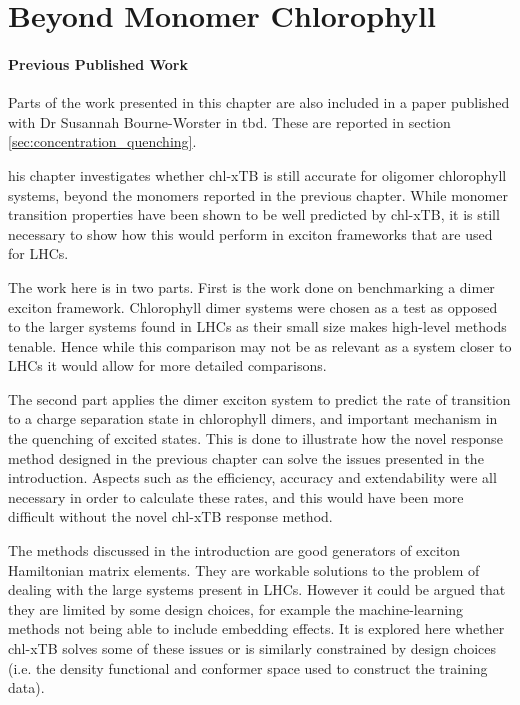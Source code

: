 %
%
\let\textcircled=\pgftextcircled
\chapter{Beyond Monomer Chlorophyll}
\label{chap:excitons}

\subsubsection*{Previous Published Work}
Parts of the work presented in this chapter are also included in a paper published 
with Dr Susannah Bourne-Worster in tbd. These are reported in section \ref{sec:concentration_quenching}.

his chapter investigates whether chl-xTB is still accurate for oligomer 
chlorophyll systems, beyond the monomers reported in the previous chapter. While
monomer transition properties have been shown to be well predicted by chl-xTB, it
is still necessary to show how this would perform in exciton frameworks that are
used for LHCs.

The work here is in two parts. First is the work done on benchmarking a dimer exciton
framework. Chlorophyll dimer systems were chosen as a test as opposed to the larger
systems found in LHCs as their small size makes high-level methods tenable. Hence
while this comparison may not be as relevant as a system closer to LHCs it would
allow for more detailed comparisons. 

The second part applies the dimer exciton system to predict the rate of transition 
to a charge separation state in chlorophyll dimers, and important mechanism in the
quenching of excited states. This is done to illustrate how the novel response method
designed in the previous chapter can solve the issues presented in the introduction.
Aspects such as the efficiency, accuracy and extendability were all necessary in
order to calculate these rates, and this would have been more difficult without 
the novel chl-xTB response method.

The methods discussed in the introduction are good generators of exciton Hamiltonian
matrix elements. They are workable solutions to the problem of dealing with the
large systems present in LHCs. However it could be argued that they are limited
by some design choices, for example the machine-learning methods not being able
to include embedding effects. It is explored here whether chl-xTB solves some of
these issues or is similarly constrained by design choices (i.e. the density functional 
and conformer space used to construct the training data).

